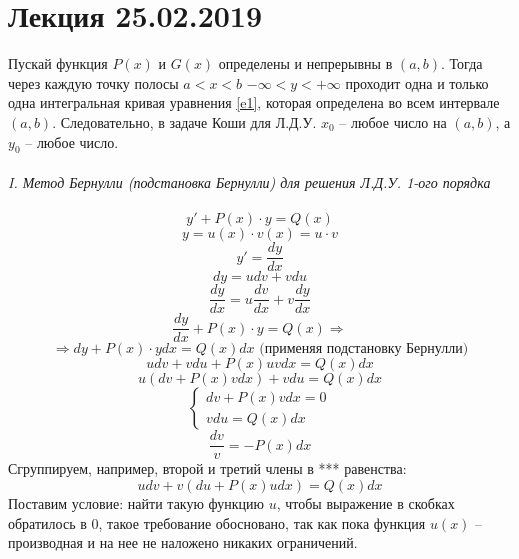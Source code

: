 \documentclass{article}
\numberwithin{equation}{section}
\begin{document}
\section{Лекция 25.02.2019}
Пускай функция $P(x)$ и $G(x)$ определены и непрерывны в $(a,b)$. Тогда через каждую точку полосы $a<x<b$ $-\infty<y<+\infty$ проходит одна и только одна интегральная кривая уравнения \colorbox{red!50}{\eqref{e1}}, которая определена во всем интервале $(a,b)$. Следовательно, в задаче Коши для Л.Д.У. $x_0$ -- любое число на $(a,b)$, а $y_0$ -- любое число.\\\\
\textit{I. Метод Бернулли (подстановка Бернулли) для решения Л.Д.У. 1-ого порядка}\\\\
\begin{equation}\label{e10}
y'+P(x)\cdot y=Q(x)
\end{equation}
\begin{equation}\label{e11}
y=u(x)\cdot v(x)=u\cdot v
\end{equation}
$$y'=\dfrac{dy}{dx}$$
\begin{equation}\label{e12}
dy=udv+vdu
\end{equation}
\begin{equation}\label{e13}
\dfrac{dy}{dx}=u\dfrac{dv}{dx}+v\dfrac{dy}{dx}
\end{equation}
$$\dfrac{dy}{dx}+P(x)\cdot y=Q(x)\Rightarrow$$
\begin{equation}\label{e14}
\Rightarrow dy+P(x)\cdot ydx=Q(x)dx\mbox{ (применяя подстановку Бернулли)}
\end{equation}
\begin{equation}\label{e15}
udv+vdu+P(x)uvdx=Q(x)dx
\end{equation}
\begin{equation}\label{e16}
u(dv+P(x)vdx)+vdu=Q(x)dx
\end{equation}
\begin{equation*}
\begin{cases}
dv+P(x)vdx=0\\
vdu=Q(x)dx
\end{cases}
\end{equation*}
$$\dfrac{dv}{v}=-P(x)dx$$
Сгруппируем, например, второй и третий члены в \colorbox{red!50}{***} равенства:
\begin{equation}\label{e17}
udv+v(du+P(x)udx)=Q(x)dx
\end{equation}
Поставим условие: найти такую функцию $u$, чтобы выражение в скобках обратилось в 0, такое требование обосновано, так как пока функция $u(x)$ -- производная и на нее не наложено никаких ограничений.
\end{document}
